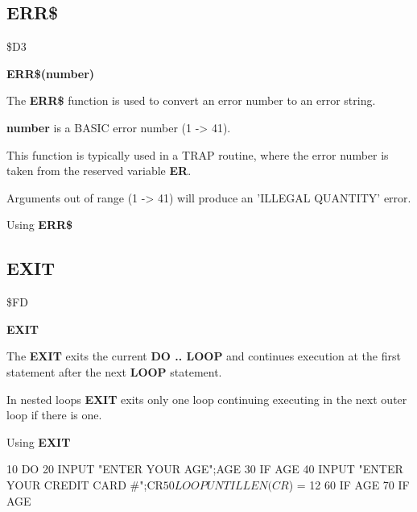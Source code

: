 
\newpage
\subsection{ERR\$}
\begin{description}[leftmargin=3cm,style=nextline]
\item [Token:] \$D3
\item [Format:] {\bf ERR\$(number)}
\item [Usage:] The {\bf ERR\$} function is used to convert
               an error number to an error string.

   {\bf number} is a BASIC error number (1 -> 41).

This function is typically used in a TRAP routine,
where the error number is taken from the reserved variable {\bf ER}.

\item [Remarks:] Arguments out of range (1 -> 41) will
                 produce an 'ILLEGAL QUANTITY' error.

\item [Example:] Using {\bf ERR\$}
\end{description}


\newpage
\subsection{EXIT}
\begin{description}[leftmargin=3cm,style=nextline]
\item [Token:] \$FD
\item [Format:] {\bf EXIT}
\item [Usage:] The {\bf EXIT} exits the current {\bf DO .. LOOP}
               and continues execution at the first
               statement after the next {\bf LOOP} statement.

\item [Remarks:] In nested loops {\bf EXIT} exits only one loop
               continuing executing in the next outer loop
               if there is one.
\item [Example:] Using {\bf EXIT}
\begin{screenoutput}
10 DO
20 INPUT "ENTER YOUR AGE";AGE%
30 IF AGE%
40 INPUT "ENTER YOUR CREDIT CARD #";CR$
50 LOOP UNTIL LEN(CR$) = 12
60 IF AGE%
70 IF AGE%
\end{screenoutput}
\end{description}

